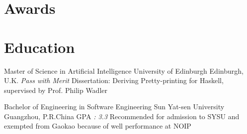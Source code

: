 \documentclass[11pt,a4paper,sans]{moderncv}
\begin{document}
\section{Awards}

\section{Education}
{Master of Science in Artificial Intelligence}
{University of Edinburgh}
{Edinburgh, U.K.}
{\textit{Pass with Merit}}
{Dissertation: Deriving Pretty-printing for Haskell, supervised by Prof. Philip Wadler}

{Bachelor of Engineering in Software Engineering}
{Sun Yat-sen University}
{Guangzhou, P.R.China}
{GPA \textit{: 3.3}}
{Recommended for admission to SYSU and exempted from Gaokao because of well performance at NOIP}
\end{document}
